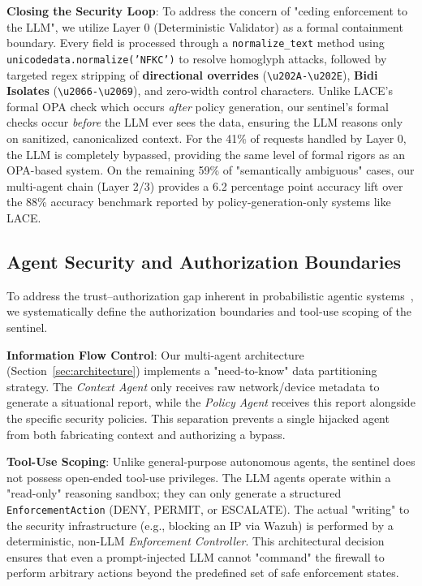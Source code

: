 \documentclass[conference]{IEEEtran}
\begin{document}
\textbf{Closing the Security Loop}: To address the concern of "ceding enforcement to the LLM", we utilize Layer 0 (Deterministic Validator) as a formal containment boundary. Every field is processed through a \texttt{normalize\_text} method using \texttt{unicodedata.normalize('NFKC')} to resolve homoglyph attacks, followed by targeted regex stripping of \textbf{directional overrides} (\texttt{\textbackslash u202A-\textbackslash u202E}), \textbf{Bidi Isolates} (\texttt{\textbackslash u2066-\textbackslash u2069}), and zero-width control characters. Unlike LACE's formal OPA check which occurs \textit{after} policy generation, our sentinel's formal checks occur \textit{before} the LLM ever sees the data, ensuring the LLM reasons only on sanitized, canonicalized context. For the 41\% of requests handled by Layer 0, the LLM is completely bypassed, providing the same level of formal rigors as an OPA-based system. On the remaining 59\% of "semantically ambiguous" cases, our multi-agent chain (Layer 2/3) provides a 6.2 percentage point accuracy lift over the 88\% accuracy benchmark reported by policy-generation-only systems like LACE.

\subsection{Agent Security and Authorization Boundaries}

To address the trust--authorization gap inherent in probabilistic agentic systems~\cite{nistai2024}, we systematically define the authorization boundaries and tool-use scoping of the sentinel.

\textbf{Information Flow Control}: Our multi-agent architecture (Section~\ref{sec:architecture}) implements a "need-to-know" data partitioning strategy. The \textit{Context Agent} only receives raw network/device metadata to generate a situational report, while the \textit{Policy Agent} receives this report alongside the specific security policies. This separation prevents a single hijacked agent from both fabricating context and authorizing a bypass.

\textbf{Tool-Use Scoping}: Unlike general-purpose autonomous agents, the sentinel does not possess open-ended tool-use privileges. The LLM agents operate within a "read-only" reasoning sandbox; they can only generate a structured \texttt{EnforcementAction} (DENY, PERMIT, or ESCALATE). The actual "writing" to the security infrastructure (e.g., blocking an IP via Wazuh) is performed by a deterministic, non-LLM \textit{Enforcement Controller}. This architectural decision ensures that even a prompt-injected LLM cannot "command" the firewall to perform arbitrary actions beyond the predefined set of safe enforcement states.
\end{document}
